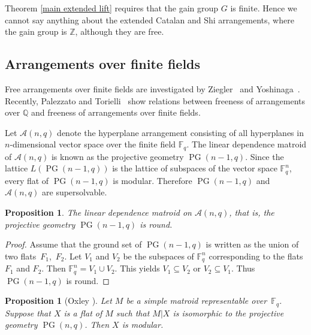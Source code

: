 \documentclass[pdftex]{sigma}
\numberwithin{equation}{section}
\newtheorem{Proposition}[Theorem]{Proposition}
 { \theoremstyle{definition}
\newtheorem{Definition}[Theorem]{Definition}
\newtheorem{Example}[Theorem]{Example}
\newtheorem{Remark}[Theorem]{Remark}
\newtheorem{Question}[Theorem]{Question} }
\DeclareMathOperator{\PG}{PG}
\begin{document}
\begin{Remark}Theorem \ref{main extended lift} requires that the gain group $ G $ is finite. Hence we cannot say anything about the extended Catalan and Shi arrangements, where the gain group is $ \mathbb{Z} $, although they are free.
\end{Remark}

\subsection{Arrangements over finite fields}
Free arrangements over finite fields are investigated by Ziegler~\cite{ziegler1990matroid-totams} and Yoshinaga~\cite{yoshinaga2007free-potjasams}. Recently, Palezzato and Torielli~\cite{palezzato2019free-joac} show relations between freeness of arrangements over $ \mathbb{Q} $ and freeness of arrangements over finite fields.

Let $ \mathcal{A}(n,q) $ denote the hyperplane arrangement consisting of all hyperplanes in $ n $-dimensional vector space over the finite field $ \mathbb{F}_{q} $. The linear dependence matroid of $ \mathcal{A}(n,q) $ is known as the projective geometry $ \PG(n-1,q) $. Since the lattice $ L(\PG(n-1,q)) $ is the lattice of subspaces of the vector space $ \mathbb{F}_{q}^{n} $, every flat of $ \PG(n-1,q) $ is modular. Therefore $ \PG(n-1,q) $ and $ \mathcal{A}(n,q) $ are supersolvable.

\begin{Proposition}\label{PG round}
The linear dependence matroid on $ \mathcal{A}(n,q) $, that is, the projective geometry $ \PG(n-1,q) $ is round.
\end{Proposition}
\begin{proof}Assume that the ground set of $ \PG(n-1,q) $ is written as the union of two flats~$ F_{1}$,~$F_{2} $.
Let $ V_{1} $ and $ V_{2} $ be the subspaces of $ \mathbb{F}_{q}^{n} $ corresponding to the flats $ F_{1} $ and $ F_{2} $.
Then $ \mathbb{F}_{q}^{n} = V_{1} \cup V_{2} $. This yields $ V_{1} \subseteq V_{2} $ or $ V_{2} \subseteq V_{1} $. Thus $ \PG(n-1,q) $ is round.
\end{proof}

\begin{Proposition}[Oxley {\cite[Corollary~6.9.6]{oxley2011matroid}}]\label{PG modular}
Let $ M $ be a simple matroid representable over~$ \mathbb{F}_{q} $.
Suppose that $ X $ is a flat of $ M $ such that $ M|X $ is isomorphic to the projective geometry $ \PG(n,q) $.
Then $ X $ is modular.
\end{Proposition}
\end{document}
